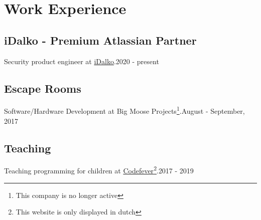 \section{Work Experie\textcolor{mycolor}{nce}}
  \subsection{iDalko - Premium Atlassian Partner}
    Security product engineer at {\href{https://www.idalko.com}{iDalko}}.{\textcolor{mygrey}{\hspace*{\fill}2020 - present}}
  \subsection{Escape Rooms}
    Software/Hardware Development at {\textcolor{mycolor}{Big Moose Projects}}\footnote{This company is no longer active}.{\textcolor{mygrey}{\hspace*{\fill}August - September, 2017}}
  \subsection{Teaching}
    Teaching programming for children at {\href{https://www.codefever.be/nl}{Codefever}}\footnote{This website is only displayed in dutch}.{\textcolor{mygrey}{\hspace*{\fill}2017 - 2019}}

